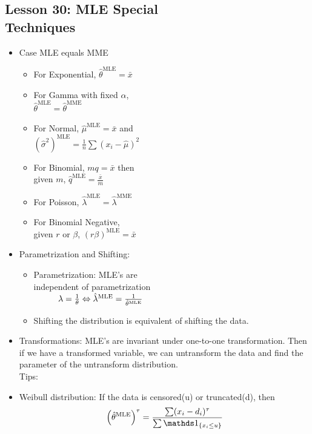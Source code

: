 \documentclass[10pt, french]{article}
\begin{document}
\begin{multicols*}{3}
\section*{Lesson 30: MLE Special \\ Techniques}
\begin{itemize}[align=left,leftmargin=*]
    \item Case MLE equals MME
    \begin{itemize}
        \item For Exponential, $\hat{\theta}^{\mathrm{MLE}}=\bar{x}$
        \item For Gamma with fixed $\alpha$, \\ $\hat{\theta}^{\mathrm{MLE}} = \hat{\theta}^{\mathrm{MME}}$
        \item For Normal, $\hat{\mu}^{\mathrm{MLE}}=\bar{x}$ and \\ $(\hat{\sigma}^2)^{\mathrm{MLE}} = \frac{1}{n} \sum (x_i-\hat{\mu})^2$
        \item For Binomial, $mq=\bar{x}$ then \\ given $m$, $\hat{q}^{\mathrm{MLE}}=\frac{\bar{x}}{m}$
        \item For Poisson, $\hat{\lambda}^{\mathrm{MLE}}=\hat{\lambda}^{\mathrm{MME}}$
        \item For Binomial Negative, \\ given  $r$ or $\beta$, $(r \beta)^{\mathrm{MLE}} = \bar{x}$
    \end{itemize}
    \item Parametrization and Shifting:
    \begin{itemize}
        \item Parametrization: MLE's are \\ independent of parametrization \\ $\hspace*{1cm} \lambda = \frac{1}{\theta} \Leftrightarrow \hat{\lambda}^{\mathrm{MLE}} = \frac{1}{\hat{\theta}^{\mathrm{MLE}}}$
        \item Shifting the distribution is equivalent of shifting the data.
    \end{itemize}
    \item Transformations: MLE's are invariant under one-to-one transformation. Then if we have a transformed variable, we can untransform the data and find the parameter of the untransform distribution. \\
    Tips: {\color{AppendixColor} }
    \item Weibull distribution: If the data is censored(u) or truncated(d), then \[ \left(\hat{\theta}^{\mathrm{MLE}}\right)^\tau=\frac{\sum (x_i - d_i)^\tau}{\sum \indic{x_i \leq u}}\]

\end{itemize}
\end{multicols*}
\end{document}

